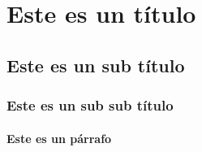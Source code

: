 \documentclass[../Main.tex]{subfiles}
\begin{document}
\section{Este es un título}

\lipsum[10-14] %

\subsection{Este es un sub título}

\lipsum[15-17] %

\subsubsection{Este es un sub sub título}

\lipsum[15-17] %

\paragraph{Este es un párrafo}

\lipsum[18-19] %

\biblio %
\end{document}
